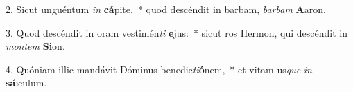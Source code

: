 2. Sicut unguéntum \textit{in} \textbf{cá}pite,~*  quod descéndit in barbam, \textit{bar}\textit{bam} \textbf{A}aron.\

3. Quod descéndit in oram vestimén\textit{ti} \textbf{e}jus:~*  sicut ros Hermon, qui descéndit in \textit{mon}\textit{tem} \textbf{Si}on.\

4. Quóniam illic mandávit Dóminus benedic\textit{ti}\textbf{ó}nem,~*  et vitam us\textit{que} \textit{in} \textbf{sǽ}culum.\

